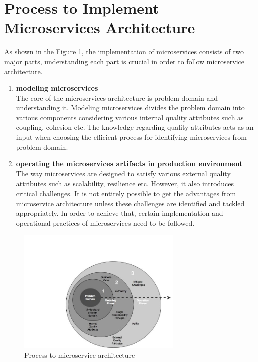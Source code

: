 \section{Process to Implement Microservices Architecture}\label{section:guidelines/process_to_microservices}
As shown in the Figure \ref{fig:guidelines/chapter_nine_process}, the implementation of microservices consists of two major parts, understanding each part is crucial in order to follow microservice architecture.
\begin{enumerate}
\item \textbf{modeling microservices} \\
The core of the microservices architecture is problem domain and understanding it. Modeling microservices divides the problem domain into various components considering various internal quality attributes such as coupling, cohesion etc. The knowledge regarding quality attributes acts as an input when choosing the efficient process for identifying microservices from problem domain.
\item \textbf{operating the microservices artifacts in production environment} \\
The way microservices are designed to satisfy various external quality attributes such as scalability, resilience etc. However, it also introduces critical challenges. It is not entirely possible to get the advantages from microservice architecture unless these challenges are identified and tackled appropriately. In order to achieve that, certain implementation and operational practices of microservices need to be followed.
\end{enumerate}
\begin{figure}[H]
\begin{center}
\includegraphics[width=0.7\textwidth]{figures/chapter_nine_process}
\caption{Process to microservice architecture}
\label{fig:guidelines/chapter_nine_process}
\end{center}
\end{figure}
